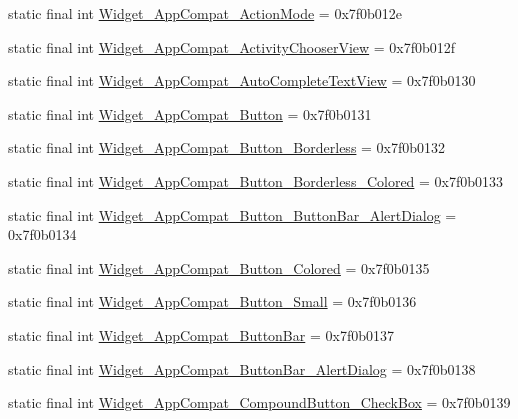 \begin{CompactItemize}
\item 
static final int \hyperlink{classandroid_1_1support_1_1graphics_1_1drawable_1_1_r_1_1style_4aa4f35592fa3c0bed403bf450f6138a}{Widget\_\-AppCompat\_\-ActionMode} = 0x7f0b012e
\item 
static final int \hyperlink{classandroid_1_1support_1_1graphics_1_1drawable_1_1_r_1_1style_311f0730e7d2a1aba713ea24c3493e9a}{Widget\_\-AppCompat\_\-ActivityChooserView} = 0x7f0b012f
\item 
static final int \hyperlink{classandroid_1_1support_1_1graphics_1_1drawable_1_1_r_1_1style_f40c6f2368eaf2820f51f16e5c751dd2}{Widget\_\-AppCompat\_\-AutoCompleteTextView} = 0x7f0b0130
\item 
static final int \hyperlink{classandroid_1_1support_1_1graphics_1_1drawable_1_1_r_1_1style_2a8f68c04f09c49719ab8bc4da7232cc}{Widget\_\-AppCompat\_\-Button} = 0x7f0b0131
\item 
static final int \hyperlink{classandroid_1_1support_1_1graphics_1_1drawable_1_1_r_1_1style_32009d3349ac373e34aa5a019f3ef30a}{Widget\_\-AppCompat\_\-Button\_\-Borderless} = 0x7f0b0132
\item 
static final int \hyperlink{classandroid_1_1support_1_1graphics_1_1drawable_1_1_r_1_1style_ab382fac908837138535d623cc0b1632}{Widget\_\-AppCompat\_\-Button\_\-Borderless\_\-Colored} = 0x7f0b0133
\item 
static final int \hyperlink{classandroid_1_1support_1_1graphics_1_1drawable_1_1_r_1_1style_177fc3d362a96b5cdedc943186d69d42}{Widget\_\-AppCompat\_\-Button\_\-ButtonBar\_\-AlertDialog} = 0x7f0b0134
\item 
static final int \hyperlink{classandroid_1_1support_1_1graphics_1_1drawable_1_1_r_1_1style_f095fc5171752763f6c770c6dc22aa41}{Widget\_\-AppCompat\_\-Button\_\-Colored} = 0x7f0b0135
\item 
static final int \hyperlink{classandroid_1_1support_1_1graphics_1_1drawable_1_1_r_1_1style_b2af2c3180357b5dbd8315f90a057550}{Widget\_\-AppCompat\_\-Button\_\-Small} = 0x7f0b0136
\item 
static final int \hyperlink{classandroid_1_1support_1_1graphics_1_1drawable_1_1_r_1_1style_eb7b922f8dcc2cc5adf02bc7b6ec7efa}{Widget\_\-AppCompat\_\-ButtonBar} = 0x7f0b0137
\item 
static final int \hyperlink{classandroid_1_1support_1_1graphics_1_1drawable_1_1_r_1_1style_677a0adbac0a3fdf3fe61c799b570a55}{Widget\_\-AppCompat\_\-ButtonBar\_\-AlertDialog} = 0x7f0b0138
\item 
static final int \hyperlink{classandroid_1_1support_1_1graphics_1_1drawable_1_1_r_1_1style_568e8779b2829a02947b3f6e9f4de02d}{Widget\_\-AppCompat\_\-CompoundButton\_\-CheckBox} = 0x7f0b0139

\end{CompactItemize}
